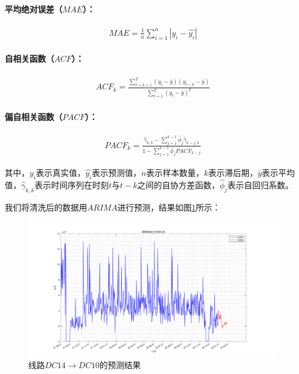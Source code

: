 \documentclass{MathorCupmodeling}
\begin{document}
\paragraph{平均绝对误差（$MAE$）：}
\begin{eqnarray}
MAE = \frac{1}{n}\sum_{i=1}^{n}|y_i-\hat{y_i}|
\end{eqnarray}

\paragraph{自相关函数（$ACF$）：}
\begin{eqnarray}
ACF_k = \frac{\sum_{t=k+1}^{T}(y_t - \bar{y})(y_{t-k}-\bar{y})}{\sum_{t=1}^{T}(y_t - \bar{y})^2}
\end{eqnarray}

\paragraph{偏自相关函数（$PACF$）：}
\begin{eqnarray}
PACF_k = \frac{\hat{\gamma}_{k,k}-\sum_{j=1}^{k-1}\hat{\phi}_j\hat{\gamma}_{k-j,k}}{1-\sum_{j=1}^{k-1}\hat{\phi}_j PACF_{k-j}}
\end{eqnarray}

其中，$y_i$表示真实值，$\hat{y_i}$表示预测值，$n$表示样本数量，$k$表示滞后期，$\bar{y}$表示平均值，$\hat{\gamma}_{k,k}$表示时间序列在时刻$t$与$t-k$之间的自协方差函数，$\hat{\phi}_j$表示自回归系数。

我们将清洗后的数据用$ARIMA$进行预测，结果如图\cref{arima}所示：
\begin{figure}[h]
		\centering
		\includegraphics[width=\textwidth]{figure/1.pdf}
		\caption{线路$DC14\to DC10$的预测结果}\label{arima}
	\end{figure}
\end{document}

